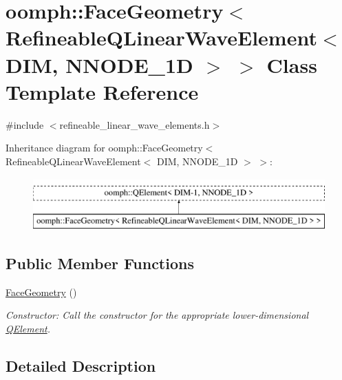 \hypertarget{classoomph_1_1FaceGeometry_3_01RefineableQLinearWaveElement_3_01DIM_00_01NNODE__1D_01_4_01_4}{}\section{oomph\+:\+:Face\+Geometry$<$ Refineable\+Q\+Linear\+Wave\+Element$<$ D\+IM, N\+N\+O\+D\+E\+\_\+1D $>$ $>$ Class Template Reference}
\label{classoomph_1_1FaceGeometry_3_01RefineableQLinearWaveElement_3_01DIM_00_01NNODE__1D_01_4_01_4}


{\ttfamily \#include $<$refineable\+\_\+linear\+\_\+wave\+\_\+elements.\+h$>$}

Inheritance diagram for oomph\+:\+:Face\+Geometry$<$ Refineable\+Q\+Linear\+Wave\+Element$<$ D\+IM, N\+N\+O\+D\+E\+\_\+1D $>$ $>$\+:\begin{figure}[H]
\begin{center}
\leavevmode
\includegraphics[height=2.000000cm]{classoomph_1_1FaceGeometry_3_01RefineableQLinearWaveElement_3_01DIM_00_01NNODE__1D_01_4_01_4}
\end{center}
\end{figure}
\subsection*{Public Member Functions}
\begin{DoxyCompactItemize}
\item 
\hyperlink{classoomph_1_1FaceGeometry_3_01RefineableQLinearWaveElement_3_01DIM_00_01NNODE__1D_01_4_01_4_a9c61cb68c89cac6d287de2c68df1e1d3}{Face\+Geometry} ()
\begin{DoxyCompactList}\small\item\em Constructor\+: Call the constructor for the appropriate lower-\/dimensional \hyperlink{classoomph_1_1QElement}{Q\+Element}. \end{DoxyCompactList}\end{DoxyCompactItemize}


\subsection{Detailed Description}
